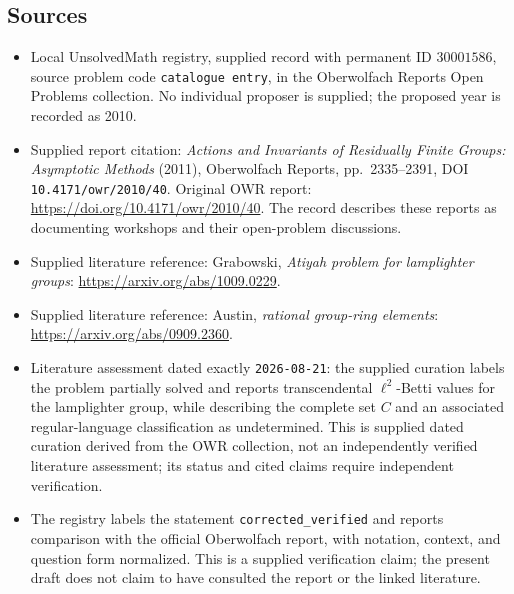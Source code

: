 \documentclass[11pt]{article}
\begin{document}
\subsection{Sources}
\begin{itemize}
\item Local UnsolvedMath registry, supplied record with permanent ID \(30001586\), source problem code \texttt{catalogue entry}, in the Oberwolfach Reports Open Problems collection. No individual proposer is supplied; the proposed year is recorded as 2010.
\item Supplied report citation: \emph{Actions and Invariants of Residually Finite Groups: Asymptotic Methods} (2011), Oberwolfach Reports, pp.~2335--2391, DOI \texttt{10.4171/owr/2010/40}. Original OWR report: \url{https://doi.org/10.4171/owr/2010/40}. The record describes these reports as documenting workshops and their open-problem discussions.
\item Supplied literature reference: Grabowski, \emph{Atiyah problem for lamplighter groups}: \url{https://arxiv.org/abs/1009.0229}.
\item Supplied literature reference: Austin, \emph{rational group-ring elements}: \url{https://arxiv.org/abs/0909.2360}.
\item Literature assessment dated exactly \texttt{2026-08-21}: the supplied curation labels the problem partially solved and reports transcendental \(\ell^2\)-Betti values for the lamplighter group, while describing the complete set \(C\) and an associated regular-language classification as undetermined. This is supplied dated curation derived from the OWR collection, not an independently verified literature assessment; its status and cited claims require independent verification.
\item The registry labels the statement \texttt{corrected\_verified} and reports comparison with the official Oberwolfach report, with notation, context, and question form normalized. This is a supplied verification claim; the present draft does not claim to have consulted the report or the linked literature.
\end{itemize}
\end{document}
